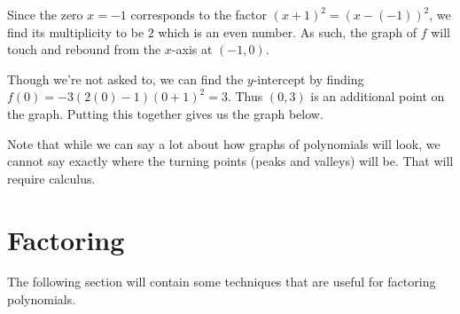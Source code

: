 \documentclass{ximera}
\begin{document}
\begin{example}
\begin{explanation}
Since the zero $x=-1$ corresponds to the factor $(x+1)^2 = (x-(-1))^2$, we find its multiplicity to be $2$ which is an even number.  As such, the graph of $f$ will touch and rebound from the $x$-axis at $(-1,0)$.  

Though we're not asked to, we can find the $y$-intercept by finding $f(0) = -3(2(0)-1)(0+1)^2 = 3$.  Thus  $(0,3)$ is an additional point on the graph.  Putting this together gives us the graph below.

\begin{image}
\end{image}

\end{explanation}
\end{example}

Note that while we can say a lot about how graphs of polynomials will look, we cannot say exactly where the turning points (peaks and valleys) will be.  That will require calculus.

\section{Factoring}
The following section will contain some techniques that are useful for factoring polynomials. 
\end{document}
